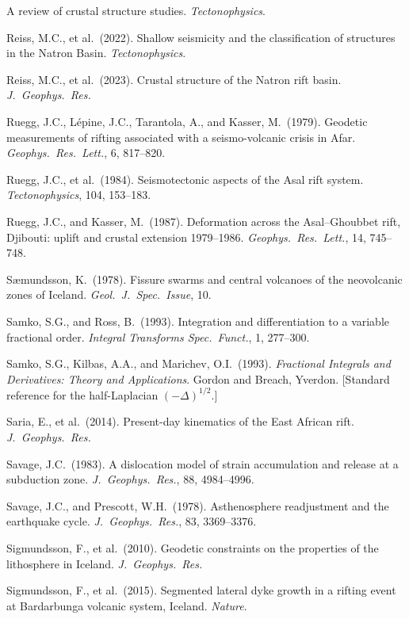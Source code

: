 \documentclass[12pt]{article}
\begin{document}
\begin{description}
    A review of crustal structure studies. \textit{Tectonophysics}.
  \item Reiss, M.C., et al.\ (2022). Shallow seismicity and the classification
    of structures in the Natron Basin. \textit{Tectonophysics}.
  \item Reiss, M.C., et al.\ (2023). Crustal structure of the Natron rift
    basin. \textit{J.\ Geophys.\ Res.}
  \item Ruegg, J.C., L\'{e}pine, J.C., Tarantola, A., and Kasser, M.\
    (1979). Geodetic measurements of rifting associated with a
    seismo-volcanic crisis in Afar. \textit{Geophys.\ Res.\ Lett.}, 6,
    817--820.
  \item Ruegg, J.C., et al.\ (1984). Seismotectonic aspects of the Asal rift
    system. \textit{Tectonophysics}, 104, 153--183.
  \item Ruegg, J.C., and Kasser, M.\ (1987). Deformation across the
    Asal--Ghoubbet rift, Djibouti: uplift and crustal extension 1979--1986.
    \textit{Geophys.\ Res.\ Lett.}, 14, 745--748.
  \item S\ae mundsson, K.\ (1978). Fissure swarms and central volcanoes of the
    neovolcanic zones of Iceland. \textit{Geol.\ J.\ Spec.\ Issue}, 10.
  \item Samko, S.G., and Ross, B.\ (1993). Integration and differentiation to
    a variable fractional order. \textit{Integral Transforms Spec.\ Funct.},
    1, 277--300.
  \item Samko, S.G., Kilbas, A.A., and Marichev, O.I.\ (1993).
    \textit{Fractional Integrals and Derivatives: Theory and Applications}.
    Gordon and Breach, Yverdon. [Standard reference for the
    half-Laplacian $(-\Delta)^{1/2}$.]
  \item Saria, E., et al.\ (2014). Present-day kinematics of the East African
    rift. \textit{J.\ Geophys.\ Res.}
  \item Savage, J.C.\ (1983). A dislocation model of strain accumulation and
    release at a subduction zone. \textit{J.\ Geophys.\ Res.}, 88, 4984--4996.
  \item Savage, J.C., and Prescott, W.H.\ (1978). Asthenosphere readjustment
    and the earthquake cycle. \textit{J.\ Geophys.\ Res.}, 83, 3369--3376.
  \item Sigmundsson, F., et al.\ (2010). Geodetic constraints on the properties
    of the lithosphere in Iceland. \textit{J.\ Geophys.\ Res.}
  \item Sigmundsson, F., et al.\ (2015). Segmented lateral dyke growth in a
    rifting event at Bardarbunga volcanic system, Iceland. \textit{Nature}.

\end{description}
\end{document}
